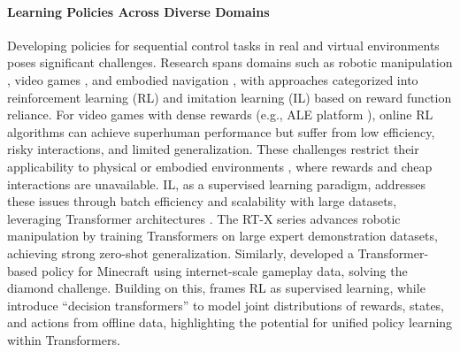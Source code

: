 \paragraph{Learning Policies Across Diverse Domains}
Developing policies for sequential control tasks in real and virtual environments poses significant challenges. Research spans domains such as robotic manipulation \citep{metaworld, language_table}, video games \citep{atari, minerl}, and embodied navigation \citep{vlnbert, habitat, leo}, with approaches categorized into reinforcement learning (RL) and imitation learning (IL) based on reward function reliance. 
For video games with dense rewards (e.g., ALE platform \citep{atari}), online RL algorithms can achieve superhuman performance \citep{dqn, agent57} but suffer from low efficiency, risky interactions, and limited generalization. These challenges restrict their applicability to physical \citep{rt-x} or embodied environments \citep{minerl}, where rewards and cheap interactions are unavailable. IL, as a supervised learning paradigm, addresses these issues through batch efficiency and scalability with large datasets, leveraging Transformer architectures \citep{tr-1, tr-2, bcz}. 
The RT-X series \citep{rt-1, rt-2, rt-x} advances robotic manipulation by training Transformers on large expert demonstration datasets, achieving strong zero-shot generalization. Similarly, \cite{vpt} developed a Transformer-based policy for Minecraft using internet-scale gameplay data, solving the diamond challenge. Building on this, \cite{udrl} frames RL as supervised learning, while \cite{dt, mgdt} introduce “decision transformers” to model joint distributions of rewards, states, and actions from offline data, highlighting the potential for unified policy learning within Transformers.

